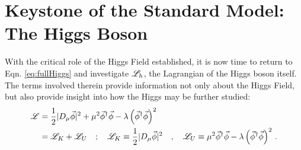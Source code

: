 \section{Keystone of the Standard Model: The Higgs Boson} \label{sec:higgs_boson}

    With the critical role of the Higgs Field established, it is now time to return to Eqn. \ref{eq:fullHiggs}
        and investigate $\mathscr{L}_h$, the Lagrangian of the Higgs boson itself.
    The terms involved therein provide information not only about the Higgs Field,
        but also provide insight into how the Higgs may be further studied:
    \begin{equation} \begin{split}
        \mathscr{L} &= \frac{1}{2} |D_{\mu} \vec{\phi}|^2 +
            \mu^2 \vec{\phi}^\dag \vec{\phi} - \lambda \left( \vec{\phi}^\dag\vec{\phi} \right)^2
        \\&= \mathscr{L}_K + \mathscr{L}_U \quad ; \quad 
            \mathscr{L}_K \equiv \frac{1}{2} |D_{\mu} \vec{\phi}|^2 \quad , \quad
            \mathscr{L}_U \equiv \mu^2 \vec{\phi}^\dag \vec{\phi} - \lambda \left( \vec{\phi}^\dag\vec{\phi} \right)^2
        \,.
    \end{split} \end{equation}
    
